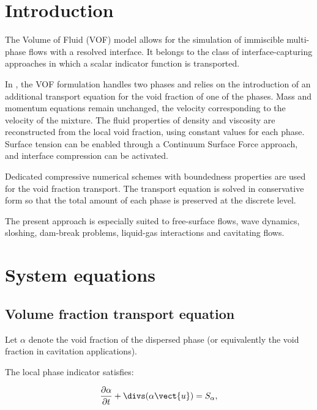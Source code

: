 \section{Introduction}
\label{sec:vof}

\hypertarget{cs_vof}{}

The Volume of Fluid (VOF) model allows for the simulation of immiscible
multi-phase flows with a resolved interface. It belongs to the class of
interface-capturing approaches in which a scalar indicator function is
transported.

In \CS, the VOF formulation handles two phases and relies on the introduction
of an additional transport equation for the void fraction of one of the phases.
Mass and momentum equations remain unchanged, the velocity corresponding to the
velocity of the mixture. The fluid properties of density and viscosity are
reconstructed from the local void fraction, using constant values for each
phase. Surface tension can be enabled through a Continuum Surface Force
approach, and interface compression can be activated.

Dedicated compressive numerical schemes with boundedness properties are used
for the void fraction transport. The transport equation is solved in
conservative form so that the total amount of each phase is preserved at the
discrete level.

The present approach is especially suited to free-surface flows, wave dynamics,
sloshing, dam-break problems, liquid-gas interactions and cavitating flows.


\section{System equations}

\subsection{Volume fraction transport equation}

Let $\alpha$ denote the void fraction of the dispersed phase
(or equivalently the void fraction in cavitation applications).

The local phase indicator satisfies:

\begin{equation}
\frac{\partial \alpha}{\partial t}+\divs (\alpha \vect{u})=S_\alpha ,
\label{eq:vof:transport}
\end{equation}

